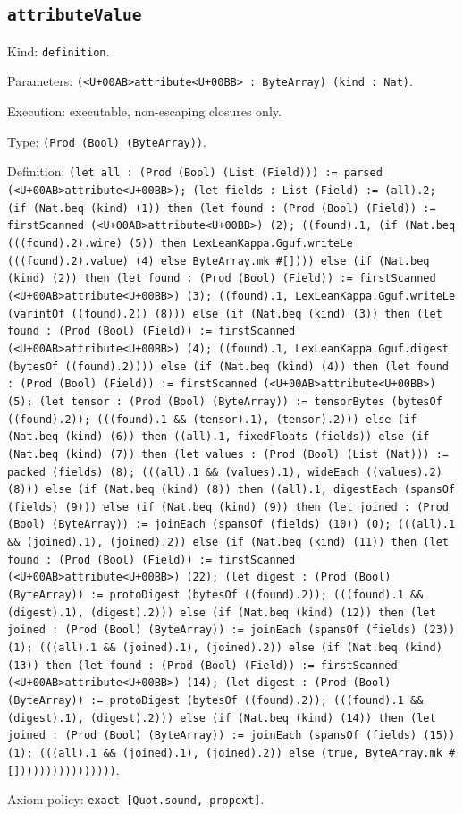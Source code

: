 \documentclass[11pt]{article}
\begin{document}
\subsection*{\texttt{attributeValue}}
\noindent Kind: \texttt{definition}.\par
\noindent Parameters: \texttt{(<U+00AB>attribute<U+00BB> : ByteArray) (kind : Nat)}.\par
\noindent Execution: executable, non-escaping closures only.\par
\noindent Type: \texttt{(Prod (Bool) (ByteArray))}.\par
\noindent Definition: \texttt{(let all : (Prod (Bool) (List (Field))) := parsed (<U+00AB>attribute<U+00BB>); (let fields : List (Field) := (all).2; (if (Nat.beq (kind) (1)) then (let found : (Prod (Bool) (Field)) := firstScanned (<U+00AB>attribute<U+00BB>) (2); ((found).1, (if (Nat.beq (((found).2).wire) (5)) then LexLeanKappa.Gguf.writeLe (((found).2).value) (4) else ByteArray.mk \#[]))) else (if (Nat.beq (kind) (2)) then (let found : (Prod (Bool) (Field)) := firstScanned (<U+00AB>attribute<U+00BB>) (3); ((found).1, LexLeanKappa.Gguf.writeLe (varintOf ((found).2)) (8))) else (if (Nat.beq (kind) (3)) then (let found : (Prod (Bool) (Field)) := firstScanned (<U+00AB>attribute<U+00BB>) (4); ((found).1, LexLeanKappa.Gguf.digest (bytesOf ((found).2)))) else (if (Nat.beq (kind) (4)) then (let found : (Prod (Bool) (Field)) := firstScanned (<U+00AB>attribute<U+00BB>) (5); (let tensor : (Prod (Bool) (ByteArray)) := tensorBytes (bytesOf ((found).2)); (((found).1 \&\& (tensor).1), (tensor).2))) else (if (Nat.beq (kind) (6)) then ((all).1, fixedFloats (fields)) else (if (Nat.beq (kind) (7)) then (let values : (Prod (Bool) (List (Nat))) := packed (fields) (8); (((all).1 \&\& (values).1), wideEach ((values).2) (8))) else (if (Nat.beq (kind) (8)) then ((all).1, digestEach (spansOf (fields) (9))) else (if (Nat.beq (kind) (9)) then (let joined : (Prod (Bool) (ByteArray)) := joinEach (spansOf (fields) (10)) (0); (((all).1 \&\& (joined).1), (joined).2)) else (if (Nat.beq (kind) (11)) then (let found : (Prod (Bool) (Field)) := firstScanned (<U+00AB>attribute<U+00BB>) (22); (let digest : (Prod (Bool) (ByteArray)) := protoDigest (bytesOf ((found).2)); (((found).1 \&\& (digest).1), (digest).2))) else (if (Nat.beq (kind) (12)) then (let joined : (Prod (Bool) (ByteArray)) := joinEach (spansOf (fields) (23)) (1); (((all).1 \&\& (joined).1), (joined).2)) else (if (Nat.beq (kind) (13)) then (let found : (Prod (Bool) (Field)) := firstScanned (<U+00AB>attribute<U+00BB>) (14); (let digest : (Prod (Bool) (ByteArray)) := protoDigest (bytesOf ((found).2)); (((found).1 \&\& (digest).1), (digest).2))) else (if (Nat.beq (kind) (14)) then (let joined : (Prod (Bool) (ByteArray)) := joinEach (spansOf (fields) (15)) (1); (((all).1 \&\& (joined).1), (joined).2)) else (true, ByteArray.mk \#[])))))))))))))))}.\par
\noindent Axiom policy: \texttt{exact [Quot.sound, propext]}.\par
\end{document}
